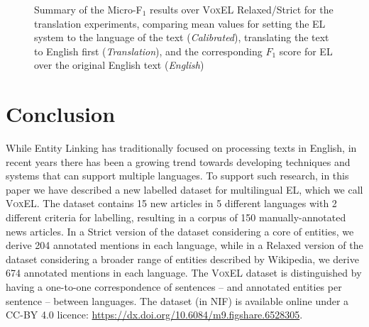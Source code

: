 \documentclass{llncs}
\begin{document}
\begin{figure}[t]
{
}
\caption{Summary of the Micro-F$_1$ results over \textsc{VoxEL} Relaxed/Strict for the translation experiments, comparing mean values for setting the EL system to the language of the text (\textit{Calibrated}), translating the text to English first (\textit{Translation}), and the corresponding $F_1$ score for EL over the original English text (\textit{English})}
\label{fig:bars}
\end{figure}


\section{Conclusion}
\label{sec:conclusion}

While Entity Linking has traditionally focused on processing texts in English, in recent years there has been a growing trend towards developing techniques and systems that can support multiple languages. To support such research, in this paper we have described a new labelled dataset for multilingual EL, which we call \textsc{VoxEL}. The dataset contains 15 new articles in 5 different languages with 2 different criteria for labelling, resulting in a corpus of 150 manually-annotated news articles. In a Strict version of the dataset considering a core of entities, we derive 204 annotated mentions in each language, while in a Relaxed version of the dataset considering a broader range of entities described by Wikipedia, we derive 674 annotated mentions in each language. The \textsc{VoxEL} dataset is distinguished by having a one-to-one correspondence of sentences -- and annotated entities per sentence -- between languages. The dataset (in NIF) is available online under a CC-BY 4.0 licence: \url{https://dx.doi.org/10.6084/m9.figshare.6528305}.
\end{document}
